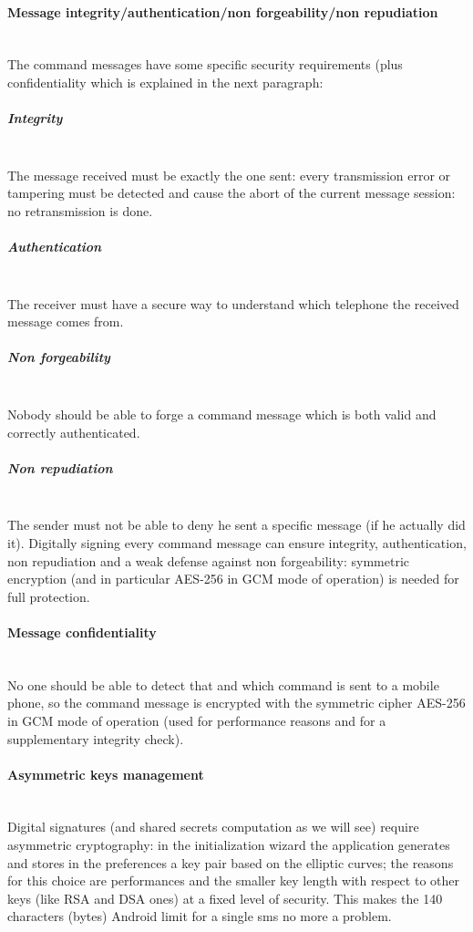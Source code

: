 \documentclass[a4paper,12pt]{article}
\begin{document}
\paragraph{Message integrity/authentication/non forgeability/non repudiation} \hspace{0pt} \\
\small{The command messages have some specific security requirements (plus confidentiality which is explained in the next paragraph:}
\subparagraph{\textit{Integrity}} \hspace{0pt} \\
\small{The message received must be exactly the one sent: every transmission error or tampering must be detected and cause the abort of the current message session: no retransmission is done.}
\subparagraph{\textit{Authentication}} \hspace{0pt} \\
\small{The receiver must have a secure way to understand which telephone the received message comes from.}
\subparagraph{\textit{Non forgeability}} \hspace{0pt} \\
\small{Nobody should be able to forge a command message which is both valid and correctly authenticated.}
\subparagraph{\textit{Non repudiation}} \hspace{0pt} \\
\small{The sender must not be able to deny he sent a specific message (if he actually did it).}
\vspace{25pt}
\newline
\small{Digitally signing every command message can ensure integrity, authentication, non repudiation and a weak defense against non forgeability: symmetric encryption (and in particular AES-256 in GCM mode of operation) is needed for full protection.}
\paragraph{Message confidentiality} \hspace{0pt} \\
\small{No one should be able to detect that and which command is sent to a mobile phone, so the command message is encrypted with the symmetric cipher AES-256 in GCM mode of operation (used for performance reasons and for a supplementary integrity check).}
\paragraph{Asymmetric keys management} \hspace{0pt} \\
\small{Digital signatures (and shared secrets computation as we will see) require asymmetric cryptography: in the initialization wizard the application generates and stores in the preferences a key pair based on the elliptic curves; the reasons for this choice are performances and the smaller key length with respect to other keys (like RSA and DSA ones) at a fixed level of security. This makes the 140 characters (bytes) Android limit for a single sms no more a problem.}
\end{document}
